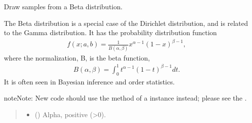 \documentclass[letterpaper,10pt,english]{sphinxmanual}
\begin{document}
\begin{fulllineitems}
\label{\detokenize{metilda.controllers:metilda.controllers.pitch_art_wizard.beta}}
\pysigstartsignatures
{}
\pysigstopsignatures
\sphinxAtStartPar
Draw samples from a Beta distribution.

\sphinxAtStartPar
The Beta distribution is a special case of the Dirichlet distribution,
and is related to the Gamma distribution.  It has the probability
distribution function
\begin{equation*}
\begin{split}f(x; a,b) = \frac{1}{B(\alpha, \beta)} x^{\alpha - 1}
(1 - x)^{\beta - 1},\end{split}
\end{equation*}
\sphinxAtStartPar
where the normalization, B, is the beta function,
\begin{equation*}
\begin{split}B(\alpha, \beta) = \int_0^1 t^{\alpha - 1}
(1 - t)^{\beta - 1} dt.\end{split}
\end{equation*}
\sphinxAtStartPar
It is often seen in Bayesian inference and order statistics.

\begin{sphinxadmonition}{note}{Note:}
\sphinxAtStartPar
New code should use the 
method of a  instance instead;
please see the .
\end{sphinxadmonition}
\begin{quote}\begin{description}
\begin{itemize}
\item {} 
\sphinxAtStartPar
{} () \textendash{} Alpha, positive (\textgreater{}0).


\end{itemize}
\end{description}
\end{quote}
\end{fulllineitems}
\end{document}

